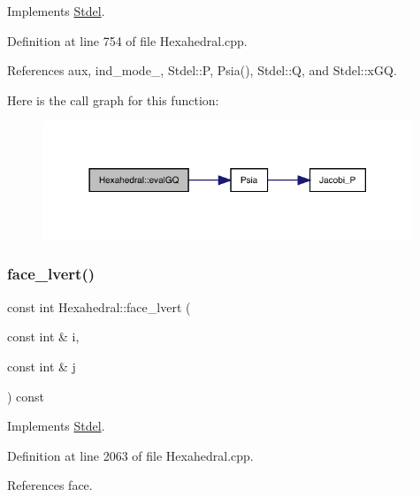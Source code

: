 Implements \hyperlink{classStdel_ae144597c3199b1757a5fbbc255e17baa}{Stdel}.



Definition at line 754 of file Hexahedral.\+cpp.



References aux, ind\+\_\+mode\+\_\+, Stdel\+::P, Psia(), Stdel\+::Q, and Stdel\+::x\+GQ.

Here is the call graph for this function\+:
\nopagebreak
\begin{figure}[H]
\begin{center}
\leavevmode
\includegraphics[width=314pt]{classHexahedral_a57cb0909590d8f68c7ea9106e4218127_cgraph}
\end{center}
\end{figure}
\mbox{\label{classHexahedral_aacb21d16b3f2d28f29ae0b9b5cf3fbf2}} 
\subsubsection{\texorpdfstring{face\+\_\+lvert()}{face\_lvert()}}
{\footnotesize\ttfamily const int Hexahedral\+::face\+\_\+lvert (\begin{DoxyParamCaption}\item[{const int \&}]{i,  }\item[{const int \&}]{j }\end{DoxyParamCaption}) const\hspace{0.3cm}{\ttfamily [virtual]}}



Implements \hyperlink{classStdel_a0df3b2fe6d87c6d0067d07ac2a2d3a32}{Stdel}.



Definition at line 2063 of file Hexahedral.\+cpp.



References face.

\mbox{\label{classHexahedral_a6c04539f29299a71e90ba1860adf702b}} 

